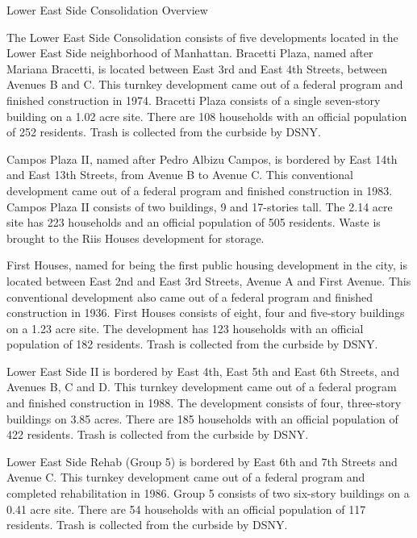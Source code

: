 Lower East Side Consolidation Overview

The Lower East Side Consolidation consists of five developments located in the Lower East Side neighborhood of Manhattan. Bracetti Plaza, named after Mariana Bracetti, is located between East 3rd  and East 4th Streets, between Avenues B and C. This turnkey development came out of a federal program and finished construction in 1974. Bracetti Plaza consists of a single seven-story building on a 1.02 acre site. There are 108 households with an official population of 252 residents. Trash is collected from the curbside by DSNY.

Campos Plaza II, named after Pedro Albizu Campos, is bordered by East 14th and East 13th Streets, from Avenue B to Avenue C. This conventional development came out of a federal program and finished construction in 1983. Campos Plaza II consists of two buildings, 9 and 17-stories tall. The 2.14 acre site has 223 households and an official population of 505 residents. Waste is brought to the Riis Houses development for storage. 

First Houses, named for being the first public housing development in the city, is located between East 2nd and East 3rd Streets, Avenue A and First Avenue. This conventional development also came out of a federal program and finished construction in 1936. First Houses consists of eight, four and five-story buildings on a 1.23 acre site. The development has 123 households with an official population of 182 residents. Trash is collected from the curbside by DSNY.

Lower East Side II is bordered by East 4th, East 5th and East 6th Streets, and Avenues B, C and D. This turnkey development came out of a federal program and finished construction in 1988. The development consists of four, three-story buildings on 3.85 acres. There are 185 households with an official population of 422 residents. Trash is collected from the curbside by DSNY.

Lower East Side Rehab (Group 5) is bordered by East 6th and 7th Streets and Avenue C. This turnkey development came out of a federal program and completed rehabilitation in 1986. Group 5 consists of two six-story buildings on a 0.41 acre site. There are 54 households with an official population of 117 residents. Trash is collected from the curbside by DSNY.